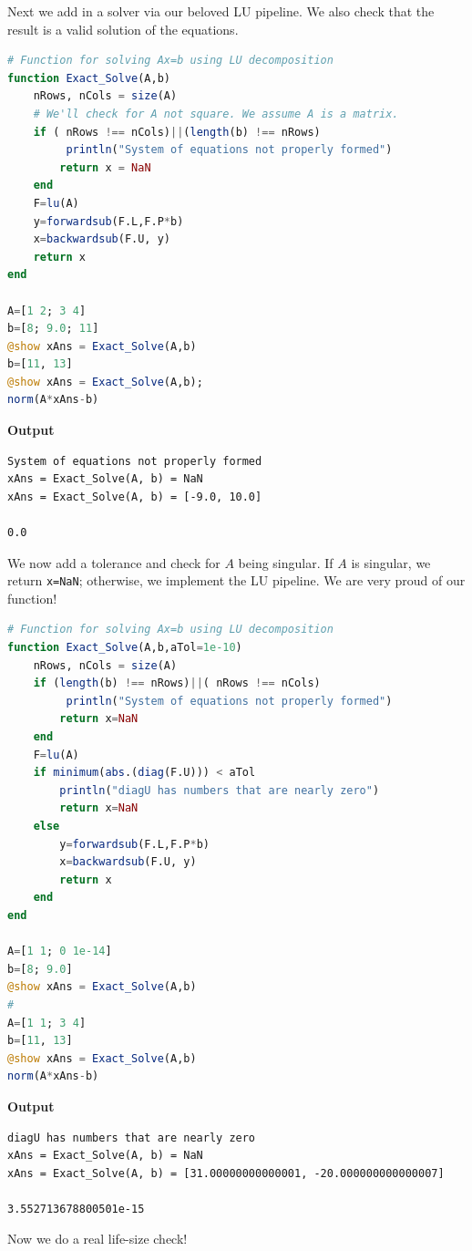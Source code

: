 Next we add in a solver via our beloved LU pipeline. We also check that the result is a valid solution of the equations.


\begin{lstlisting}[language=Julia,style=mystyle]
# Function for solving Ax=b using LU decomposition
function Exact_Solve(A,b)
    nRows, nCols = size(A) 
    # We'll check for A not square. We assume A is a matrix.
    if ( nRows !== nCols)||(length(b) !== nRows)
         println("System of equations not properly formed")
        return x = NaN
    end
    F=lu(A)
    y=forwardsub(F.L,F.P*b)
    x=backwardsub(F.U, y)
    return x
end

A=[1 2; 3 4]
b=[8; 9.0; 11]
@show xAns = Exact_Solve(A,b)
b=[11, 13]
@show xAns = Exact_Solve(A,b);
norm(A*xAns-b)
\end{lstlisting}
\textbf{Output} 
\begin{verbatim}
System of equations not properly formed
xAns = Exact_Solve(A, b) = NaN
xAns = Exact_Solve(A, b) = [-9.0, 10.0]

0.0
\end{verbatim}
We now add a tolerance and check for $A$ being singular. If $A$ is singular, we return \texttt{x=NaN}; otherwise, we implement the LU pipeline. We are very proud of our function!

\begin{lstlisting}[language=Julia,style=mystyle]
# Function for solving Ax=b using LU decomposition
function Exact_Solve(A,b,aTol=1e-10)
    nRows, nCols = size(A)
    if (length(b) !== nRows)||( nRows !== nCols)
         println("System of equations not properly formed")
        return x=NaN
    end
    F=lu(A)
    if minimum(abs.(diag(F.U))) < aTol
        println("diagU has numbers that are nearly zero")
        return x=NaN
    else
        y=forwardsub(F.L,F.P*b)
        x=backwardsub(F.U, y)
        return x 
    end
end

A=[1 1; 0 1e-14]
b=[8; 9.0]
@show xAns = Exact_Solve(A,b)
#
A=[1 1; 3 4]
b=[11, 13]
@show xAns = Exact_Solve(A,b)
norm(A*xAns-b)
\end{lstlisting}
\textbf{Output} 
\begin{verbatim}
diagU has numbers that are nearly zero
xAns = Exact_Solve(A, b) = NaN
xAns = Exact_Solve(A, b) = [31.00000000000001, -20.000000000000007]

3.552713678800501e-15
\end{verbatim}

Now we do a real life-size check! 

